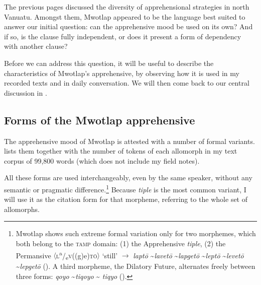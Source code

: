 \documentclass[output=paper,colorlinks,citecolor=brown]{langscibook}
\begin{document}
The previous pages discussed the diversity of apprehensional strategies in north Vanuatu. Amongst them, Mwotlap appeared to be the language best suited to answer our initial question: can the apprehensive mood be used on its own? And if so, is the clause fully independent, or does it present a form of dependency with another clause?

Before we can address this question, it will be useful to describe the characteristics of Mwotlap's apprehensive, by observing how it is used in my recorded texts and in daily conversation. We will then come back to our central discussion in .
 

\subsection{Forms of the Mwotlap apprehensive}
\label{subsec:formsmwotlap}

 
The apprehensive mood of Mwotlap is attested with a number of formal variants.  lists them together with the number of tokens of each allomorph in my text corpus of 99,800 words (which does not include my field notes). 
 

\begin{table}

\caption{Free variants of the apprehensive mood marker in Mwotlap}
\label{tab:moodmarkerinM}
\end{table}

All these forms are used interchangeably, even by the same speaker, without any semantic or pragmatic difference.\footnote{Mwotlap shows such extreme formal variation only for two morphemes, which both belong to the \textsc{tamp} domain: (1) the Apprehensive \textit{tiple}, (2) the Permansive ${\langle}$\textsc{l}\textsuperscript{a}/\textsubscript{e}\textsc{v}((g)e)\textsc{tō}${\rangle}$ `still' $\rightarrow$ \textit{laptō} \textasciitilde \textit{lavetō} \textasciitilde \textit{lapgetō} \textasciitilde \textit{leptō} \textasciitilde \textit{levetō} \textasciitilde \textit{lepgetō} (\citealt[130]{francois2003}). A third morpheme, the Dilatory Future, alternates freely between three forms: \textit{qoyo} \textasciitilde \textit{tiqoyo} {\textasciitilde} \textit{tiqyo} (\citealt[38]{francois2003}).} Because \textit{tiple} is the most common variant, I will use it as the citation form for that morpheme, referring to the whole set of allomorphs. 
\end{document}
